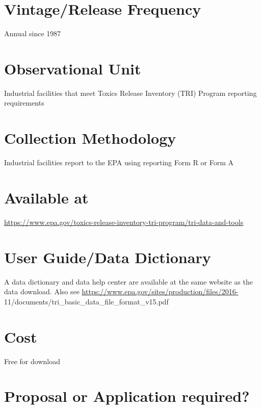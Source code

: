 \documentclass[
]{book}
\begin{document}
\hypertarget{vintagerelease-frequency-88}{%
\section{Vintage/Release Frequency}\label{vintagerelease-frequency-88}}

Annual since 1987

\hypertarget{observational-unit-88}{%
\section{Observational Unit}\label{observational-unit-88}}

Industrial facilities that meet Toxics Release Inventory (TRI) Program reporting requirements

\hypertarget{collection-methodology-88}{%
\section{Collection Methodology}\label{collection-methodology-88}}

Industrial facilities report to the EPA using reporting Form R or Form A

\hypertarget{available-at-88}{%
\section{Available at}\label{available-at-88}}

\url{https://www.epa.gov/toxics-release-inventory-tri-program/tri-data-and-tools}

\hypertarget{user-guidedata-dictionary-88}{%
\section{User Guide/Data Dictionary}\label{user-guidedata-dictionary-88}}

A data dictionary and data help center are available at the same website as the data download. Also see \url{https://www.epa.gov/sites/production/files/2016-} 11/documents/tri\_basic\_data\_file\_format\_v15.pdf

\hypertarget{cost-88}{%
\section{Cost}\label{cost-88}}

Free for download

\hypertarget{proposal-or-application-required-88}{%
\section{Proposal or Application required?}\label{proposal-or-application-required-88}}
\end{document}

